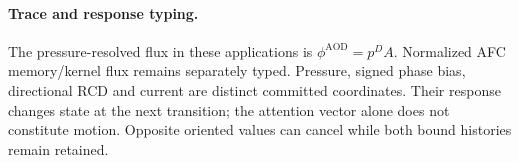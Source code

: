
\paragraph{Trace and response typing.}
The pressure-resolved flux in these applications is \(\phi^{\mathrm{AOD}}=p^D A\).
Normalized AFC memory/kernel flux remains separately typed. Pressure, signed
phase bias, directional RCD and current are distinct committed coordinates.
Their response changes state at the next transition; the attention vector
alone does not constitute motion. Opposite oriented values can cancel while
both bound histories remain retained.
